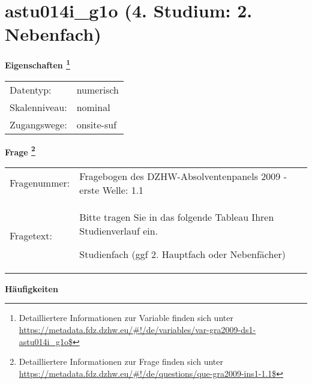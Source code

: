 
    \setcounter{footnote}{0}

    \vspace*{-1.8cm}
	\section{astu014i\_g1o (4. Studium: 2. Nebenfach)}
	\label{section:astu014i_g1o}



    \vspace*{0.5cm}
    \noindent\textbf{Eigenschaften
	\footnote{Detailliertere Informationen zur Variable finden sich unter
		\url{https://metadata.fdz.dzhw.eu/\#!/de/variables/var-gra2009-ds1-astu014i_g1o$}}}\\
	\begin{tabularx}{\hsize}{@{}lX}
	Datentyp: & numerisch \\
	Skalenniveau: & nominal \\
	Zugangswege: &
	  onsite-suf
 \\
    \end{tabularx}



				\vspace*{0.5cm}
                \noindent\textbf{Frage
	                \footnote{Detailliertere Informationen zur Frage finden sich unter
		              \url{https://metadata.fdz.dzhw.eu/\#!/de/questions/que-gra2009-ins1-1.1$}}}\\
				\begin{tabularx}{\hsize}{@{}lX}
					Fragenummer: &
					  Fragebogen des DZHW-Absolventenpanels 2009 - erste Welle:
					  1.1
 \\
					Fragetext: & Bitte tragen Sie in das folgende Tableau Ihren Studienverlauf ein.\par  Studienfach (ggf 2. Hauptfach oder Nebenfächer) \\
				\end{tabularx}





        		\vspace*{0.5cm}
                \noindent\textbf{Häufigkeiten}

